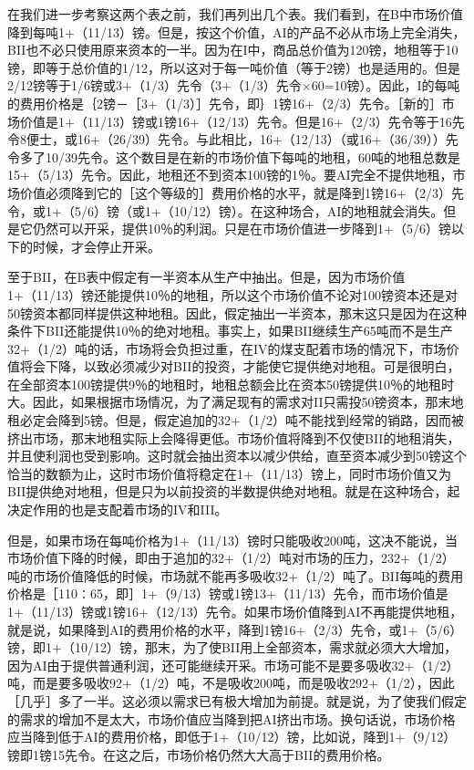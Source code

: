 在我们进一步考察这两个表之前，我们再列出几个表。我们看到，在B中市场价值降到每吨1+（11/13）镑。但是，按这个价值，AI的产品不必从市场上完全消失，BII也不必只使用原来资本的一半。因为在I中，商品总价值为120镑，地租等于10镑，即等于总价值的1/12，所以这对于每一吨价值（等于2镑）也是适用的。但是2/12镑等于1/6镑或3+（1/3）先令（3+（1/3）先令×60=10镑）。因此，I的每吨的费用价格是｛2镑－［3+（1/3）］先令，即｝1镑16+（2/3）先令。［新的］市场价值是1+（11/13）镑或1镑16+（12/13）先令。但是16+（2/3）先令等于16先令8便士，或16+（26/39）先令。与此相比，16+（12/13）（或16+（36/39））先令多了10/39先令。这个数目是在新的市场价值下每吨的地租，60吨的地租总数是15+（5/13）先令。因此，地租还不到资本100镑的1％。要AI完全不提供地租，市场价值必须降到它的［这个等级的］费用价格的水平，就是降到1镑16+（2/3）先令，或1+（5/6）镑（或1+（10/12）镑）。在这种场合，AI的地租就会消失。但是它仍然可以开采，提供10％的利润。只是在市场价值进一步降到1+（5/6）镑以下的时候，才会停止开采。

至于BII，在B表中假定有一半资本从生产中抽出。但是，因为市场价值1+（11/13）镑还能提供10％的地租，所以这个市场价值不论对100镑资本还是对50镑资本都同样提供这种地租。因此，假定抽出一半资本，那末这只是因为在这种条件下BII还能提供10％的绝对地租。事实上，如果BII继续生产65吨而不是生产32+（1/2）吨的话，市场将会负担过重，在IV的煤支配着市场的情况下，市场价值将会下降，以致必须减少对BII的投资，才能使它提供绝对地租。可是很明白，在全部资本100镑提供9％的地租时，地租总额会比在资本50镑提供10％的地租时大。因此，如果根据市场情况，为了满足现有的需求对II只需投50镑资本，那末地租必定会降到5镑。但是，假定追加的32+（1/2）吨不能找到经常的销路，因而被挤出市场，那末地租实际上会降得更低。市场价值将降到不仅使BII的地租消失，并且使利润也受到影响。这时就会抽出资本以减少供给，直至资本减少到50镑这个恰当的数额为止，这时市场价值将稳定在1+（11/13）镑上，同时市场价值又为BII提供绝对地租，但是只为以前投资的半数提供绝对地租。就是在这种场合，起决定作用的也是支配着市场的IV和III。

但是，如果市场在每吨价格为1+（11/13）镑时只能吸收200吨，这决不能说，当市场价值下降的时候，即由于追加的32+（1/2）吨对市场的压力，232+（1/2）吨的市场价值降低的时候，市场就不能再多吸收32+（1/2）吨了。BII每吨的费用价格是［110∶65，即］1+（9/13）镑或1镑13+（11/13）先令，而市场价值是1+（11/13）镑或1镑16+（12/13）先令。如果市场价值降到AI不再能提供地租，就是说，如果降到AI的费用价格的水平，降到1镑16+（2/3）先令，或1+（5/6）镑，即1+（10/12）镑，那末，为了使BII用上全部资本，需求就必须大大增加，因为AI由于提供普通利润，还可能继续开采。市场可能不是要多吸收32+（1/2）吨，而是要多吸收92+（1/2）吨，不是吸收200吨，而是吸收292+（1/2），因此［几乎］多了一半。这必须以需求已有极大增加为前提。就是说，为了使我们假定的需求的增加不是太大，市场价值应当降到把AI挤出市场。换句话说，市场价格应当降到低于AI的费用价格，即低于1+（10/12）镑，比如说，降到1+（9/12）镑即1镑15先令。在这之后，市场价格仍然大大高于BII的费用价格。

